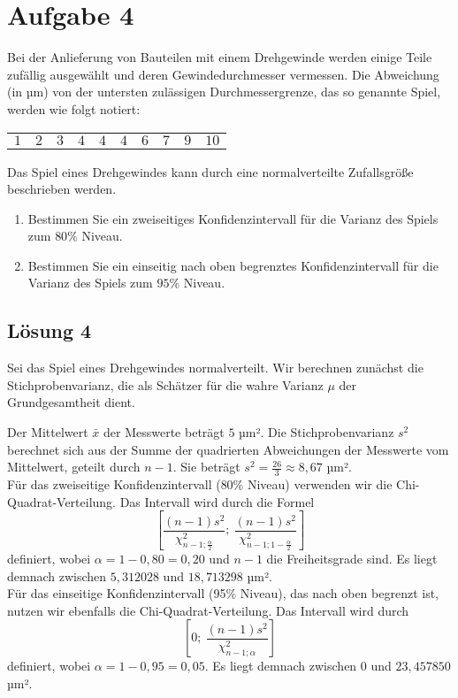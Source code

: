 \documentclass[main.tex]{subfiles}
\begin{document}
\section{Aufgabe 4}
Bei der Anlieferung von Bauteilen mit einem Drehgewinde werden einige Teile zufällig ausgewählt und deren Gewindedurchmesser vermessen. Die Abweichung (in µm) von der untersten zulässigen Durchmessergrenze, das so genannte Spiel, werden wie folgt notiert:
\begin{center}
\begin{tabular}{cccccccccc}
$1$ & $2$ & $3$ & $4$ & $4$ & $4$ & $6$ & $7$ & $9$ & $10$
\end{tabular}
\end{center}
Das Spiel eines Drehgewindes kann durch eine normalverteilte Zufallsgröße beschrieben werden.
\begin{enumerate}
\item Bestimmen Sie ein zweiseitiges Konfidenzintervall für die Varianz des Spiels zum $80\%$ Niveau.
\item Bestimmen Sie ein einseitig nach oben begrenztes Konfidenzintervall für die Varianz des Spiels zum $95$\%
Niveau.
\end{enumerate}

\subsection{Lösung 4}
Sei das Spiel eines Drehgewindes normalverteilt.
Wir berechnen zunächst die Stichprobenvarianz, die als Schätzer für die wahre Varianz $\mu$ der Grundgesamtheit dient.

Der Mittelwert $\bar{x}$ der Messwerte beträgt $5$ µm².
Die Stichprobenvarianz $s^2$ berechnet sich aus der Summe der quadrierten Abweichungen der Messwerte vom Mittelwert, geteilt durch $n-1$. Sie beträgt $s^2 = \frac{26}{3} \approx 8,67$ µm².\\

Für das zweiseitige Konfidenzintervall (80\% Niveau) verwenden wir die Chi-Quadrat-Verteilung. Das Intervall wird durch die Formel
$$
\left[
    \frac{(n-1)s^2}{\chi^2_{n-1; \frac{\alpha}{2}}};\ \frac{(n-1)s^2}{\chi^2_{n-1; 1-\frac{\alpha}{2}}}
\right]
$$
definiert, wobei $\alpha = 1 - 0,80 = 0,20$ und $n-1$ die Freiheitsgrade sind. Es liegt demnach zwischen $5,312028$ und $18,713298$ µm².\\

Für das einseitige Konfidenzintervall (95\% Niveau), das nach oben begrenzt ist, nutzen wir ebenfalls die Chi-Quadrat-Verteilung. Das Intervall wird durch $$
    \left[0;\ \frac{(n-1)s^2}{\chi^2_{n-1; \alpha}}\right]
$$ definiert, wobei $\alpha = 1 - 0,95 = 0,05$. Es liegt demnach zwischen $0$ und $23,457850$ µm².\\
\end{document}
